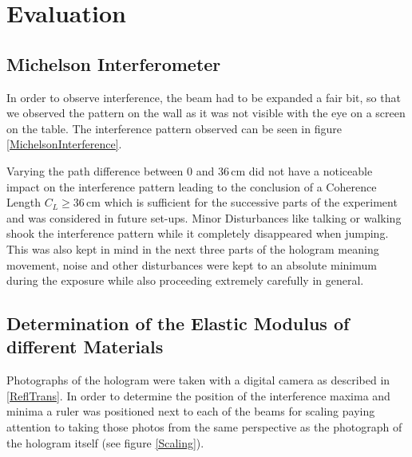 \section{Evaluation}

\subsection{Michelson Interferometer}

In order to observe interference, the beam had to be expanded a fair bit, so that we observed the pattern on the wall as it was not visible with the eye on a screen on the table. The interference pattern observed can be seen in figure \ref{MichelsonInterference}.


Varying the path difference between $0$ and $36\,\mathrm{cm}$ did not have a noticeable impact on the interference pattern leading to the conclusion of a Coherence Length $C_L \geq 36\,\mathrm{cm}$ which is sufficient for the successive parts of the experiment and was considered in future set-ups. Minor Disturbances like talking or walking shook the interference pattern while it completely disappeared when jumping. This was also kept in mind in the next three parts of the hologram meaning movement, noise and other disturbances were kept to an absolute minimum during the exposure while also proceeding extremely carefully in general. 

\subsection{Determination of the Elastic Modulus of different Materials}

Photographs of the hologram were taken with a digital camera as described in \ref{ReflTrans}. In order to determine the position of the interference maxima and minima a ruler was positioned next to each of the beams for scaling paying attention to taking those photos from the same perspective as the photograph of the hologram itself (see figure \ref{Scaling}).



